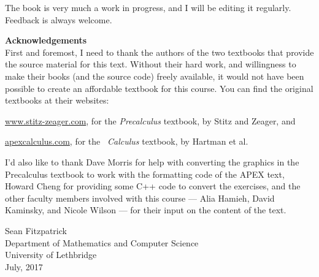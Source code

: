 The book is very much a work in progress, and I will be editing it regularly. Feedback is always welcome. 

\newpage

\noindent\textbf{\large Acknowledgements}\\

First and foremost, I need to thank the authors of the two textbooks that provide the source material for this text. Without their hard work, and willingness to make their books (and the source code) freely available, it would not have been possible to create an affordable textbook for this course. You can find the original textbooks at their websites:

\bigskip


\href{http://www.stitz-zeager.com}{www.stitz-zeager.com}, for the \textit{Precalculus} textbook, by Stitz and Zeager, and

\bigskip


\href{http://www.apexcalculus.com}{apexcalculus.com}, for the \apex\ \textit{Calculus} textbook, by Hartman et al.

\bigskip

I'd also like to thank Dave Morris for help with converting the graphics in the Precalculus textbook to work with the formatting code of the APEX text, Howard Cheng for providing some C++ code to convert the exercises, and the other faculty members involved with this course --- Alia Hamieh, David Kaminsky, and Nicole Wilson --- for their input on the content of the text.

\vspace{1in}

\begin{raggedright}
Sean Fitzpatrick\\
Department of Mathematics and Computer Science\\
University of Lethbridge\\
July, 2017
\end{raggedright}





